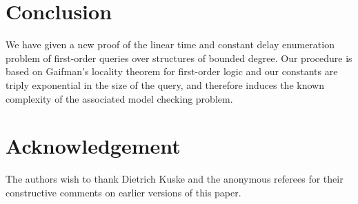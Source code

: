 \documentclass{LMCS}
\begin{document}
\section{Conclusion}

We have given a new proof of the linear time and constant delay
enumeration problem of first-order queries over structures of bounded
degree.  Our procedure is based on Gaifman's locality theorem for
first-order logic and our constants are triply exponential in the size
of the query, and therefore induces the known complexity of the
associated model checking problem.

\section*{Acknowledgement}
The authors wish to thank Dietrich Kuske and the anonymous referees for their
constructive comments on earlier versions of this paper.



\end{document}
